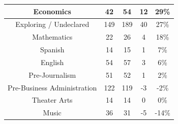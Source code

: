 \documentclass[10pt]{article}
\begin{document}
\begin{longtable}[c]{|ccccc|}
	\multicolumn{1}{|c|}{Economics}                                  & \multicolumn{1}{c|}{42}                              & \multicolumn{1}{c|}{54}                                  & \multicolumn{1}{c|}{12}                 & 29\%                  \\ \hline
	\multicolumn{1}{|c|}{Exploring / Undeclared}                     & \multicolumn{1}{c|}{149}                             & \multicolumn{1}{c|}{189}                                 & \multicolumn{1}{c|}{40}                 & 27\%                  \\ \hline
	\multicolumn{1}{|c|}{Mathematics}                                & \multicolumn{1}{c|}{22}                              & \multicolumn{1}{c|}{26}                                  & \multicolumn{1}{c|}{4}                  & 18\%                  \\ \hline
	\multicolumn{1}{|c|}{Spanish}                                    & \multicolumn{1}{c|}{14}                              & \multicolumn{1}{c|}{15}                                  & \multicolumn{1}{c|}{1}                  & 7\%                   \\ \hline
	\multicolumn{1}{|c|}{English}                                    & \multicolumn{1}{c|}{54}                              & \multicolumn{1}{c|}{57}                                  & \multicolumn{1}{c|}{3}                  & 6\%                   \\ \hline
	\multicolumn{1}{|c|}{Pre-Journalism}                             & \multicolumn{1}{c|}{51}                              & \multicolumn{1}{c|}{52}                                  & \multicolumn{1}{c|}{1}                  & 2\%                   \\ \hline
	\multicolumn{1}{|c|}{Pre-Business Administration}                & \multicolumn{1}{c|}{122}                             & \multicolumn{1}{c|}{119}                                 & \multicolumn{1}{c|}{-3}                 & -2\%                  \\ \hline
	\multicolumn{1}{|c|}{Theater Arts}                               & \multicolumn{1}{c|}{14}                              & \multicolumn{1}{c|}{14}                                  & \multicolumn{1}{c|}{0}                  & 0\%                   \\ \hline
	\multicolumn{1}{|c|}{Music}                                      & \multicolumn{1}{c|}{36}                              & \multicolumn{1}{c|}{31}                                  & \multicolumn{1}{c|}{-5}                 & -14\%                 \\ \hline

\end{longtable}
\end{document}
